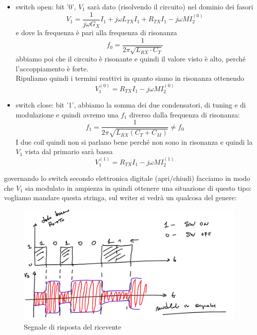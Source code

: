 \documentclass[oneside, 12pt]{extbook}
\begin{document}
\begin{itemize}
	\item switch open: bit '0', $V_1$ sarà dato (risolvendo il circuito) nel dominio dei fasori 
	\begin{equation}
		V_1 = \frac{1}{j \omega G_X} I_1 + j \omega L_{TX}I_1 + R_{TX}I_1 - j\omega M I_2^{(0)}
	\end{equation}
	e dove la frequenza è pari alla frequenza di risonanza
	\begin{equation}
		f_0 = \frac{1}{2\pi \sqrt{L_{RX} \cdot C_T}}
	\end{equation}
	abbiamo poi che il circuito è risonante e quindi il valore visto è alto, perché l'accoppiamento è forte.\\Ripuliamo quindi i termini reattivi in quanto siamo in risonanza
	ottenendo
	\begin{equation}
		V_1^{(0)} = R_{TX}I_1 - j\omega M I_2^{(0)}
	\end{equation}
	\item switch close: bit '1', abbiamo la somma dei due condensatori, di tuning e di modulazione e quindi avremo una $f_1$ diverso dalla frequenza di risonanza:
	\begin{equation}
		f_1 = \frac{1}{2\pi \sqrt{L_{RX}(C_T + C_M)}} \neq f_0
	\end{equation}
	 I due coil quindi non si parlano bene perché non sono in risonanza e quindi la $V_1$ vista dal primario sarà bassa
	 \begin{equation}
	 	V_1^{(1)} = R_{TX}I_1 -j\omega MI_2^{(1)}
	 \end{equation}
\end{itemize}
governando lo switch secondo elettronica digitale (apri/chiudi) facciamo in modo che $V_1$ sia modulato in ampiezza in quindi ottenere una situazione di questo tipo: vogliamo mandare questa stringa, sul writer si vedrà un qualcosa del genere:\\
\begin{figure}[!h]
	\includegraphics[scale=0.5]{immagini/rx_verso_tx.png}
	\caption{Segnale di risposta del ricevente}
\end{figure}\\\\
\end{document}
